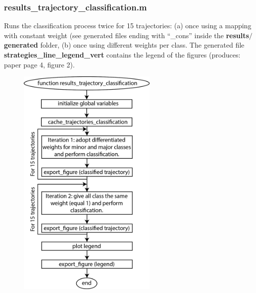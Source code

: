 \documentclass[12pt,titlepage]{article}
\begin{document}
\begin{doublespace}
\subsubsection{results\_trajectory\_classification.m}
Runs the classification process twice for 15 trajectories: (a) once using a mapping with constant weight (see generated files ending with ``\_cons'' inside the \textbf{results$/$generated} folder, (b) once using different weights per class. The generated file \textbf{strategies\_line\_legend\_vert} contains the legend of the figures (produces: paper page 4, figure 2).

\begin{figure}[H]
	\begin{center}
		\includegraphics[width=0.6\textwidth]{results_trajectory_classification.jpg}
		\label{fig2}
	\end{center}
\end{figure}


\end{doublespace}
\end{document}
